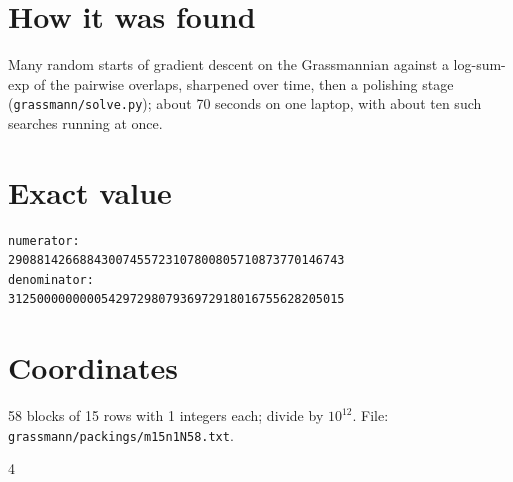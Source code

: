 \documentclass[11pt,a4paper]{article}
\begin{document}
\section{How it was found}
Many random starts of gradient descent on the Grassmannian against a log-sum-exp of the pairwise overlaps, sharpened over time, then a polishing stage (\texttt{grassmann/solve.py}); about 70 seconds on one laptop, with about ten such searches running at once.


\appendix
\section{Exact value}
{\small
\begin{verbatim}
numerator:
29088142668843007455723107800805710873770146743
denominator:
31250000000005429729807936972918016755628205015
\end{verbatim}}

\section{Coordinates}
58 blocks of 15 rows with 1 integers each; divide by $10^{12}$. File: \texttt{grassmann/packings/m15n1N58.txt}.
{\tiny
\begin{multicols}{4}
\end{multicols}}
\end{document}
